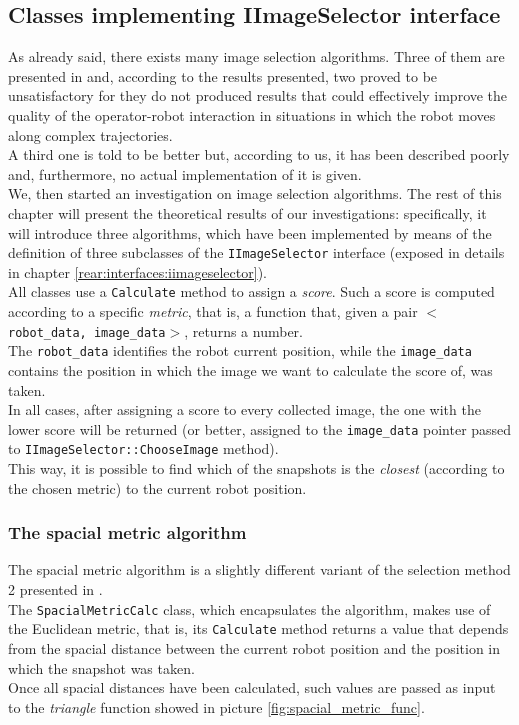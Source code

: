 \subsection{Classes implementing IImageSelector interface}
\label{concr:iimageselector}

As already said, there exists many image selection algorithms. 
Three of them are presented in \cite{sugimoto} and, according 
to the results presented, two proved to be unsatisfactory for 
they do not produced results that could effectively improve 
the quality of the operator-robot interaction in situations 
in which the robot moves along complex trajectories.
\\
A third one is told to be better but, according to us, it has 
been described poorly and, furthermore, no actual implementation 
of it is given.
\\
We, then started an investigation on image selection algorithms.
The rest of this chapter will present the theoretical results 
of our investigations: specifically, it will introduce 
three algorithms, which have been implemented by means of 
the definition of three subclasses of the 
\texttt{IImageSelector} interface (exposed in details
in chapter \ref{rear:interfaces:iimageselector}).
\\
All classes use a \texttt{Calculate} method to assign a 
\textit{score}. Such a score is computed according to 
a specific \textit{metric}, that is, a function that, 
given a pair $<$\texttt{robot\_data, image\_data}$>$, 
returns a number. 
\\
The \texttt{robot\_data} identifies the robot current position, 
while the \texttt{image\_data} contains the position 
in which the image we want to calculate the score of, 
was taken.
\\
In all cases, after assigning a score to every collected image, 
the one with the lower score will be returned 
(or better, assigned to the \texttt{image\_data} pointer 
passed to \texttt{IImageSelector::ChooseImage} method).
\\
This way, it is possible to find which of the snapshots is 
the \textit{closest} (according to the chosen metric) to 
the current robot position.

\subsubsection{The spacial metric algorithm}
\label{concr:iimageselector:spacial_metric_algorithm}

The spacial metric algorithm is a slightly different variant 
of the selection method 2 presented in \cite{sugimoto}.
\\
The \texttt{SpacialMetricCalc} class, which encapsulates 
the algorithm, makes use of the Euclidean metric, that is,
its \texttt{Calculate} method returns a value that 
depends from the spacial distance between the current 
robot position and the position in which the snapshot 
was taken.
\\
Once all spacial distances have been calculated, such values 
are passed as input to the \textit{triangle} function 
showed in picture \ref{fig:spacial_metric_func}.

